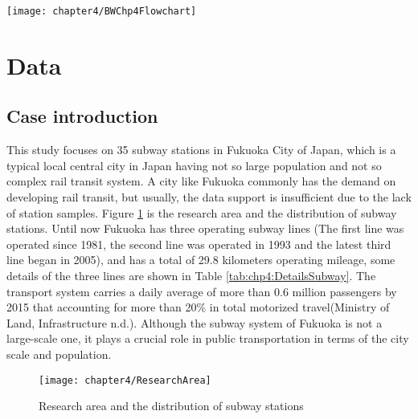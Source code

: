 \begin{sidewaysfigure}[htbp]
	\centering
	\texttt{[image: chapter4/BWChp4Flowchart]}
	\caption{Research flowchart}
	\label{fig:chp4:Chp4Flowchart}
\end{sidewaysfigure}

\section{Data}
\subsection{Case introduction}
%
This study focuses on 35 subway stations in Fukuoka City of Japan, which is a typical local central city in Japan having not so large population and not so complex rail transit system. A city like Fukuoka commonly has the demand on developing rail transit, but usually, the data support is insufficient due to the lack of station samples. Figure \ref{fig:chp4:ResearchArea} is the research area and the distribution of subway stations. Until now Fukuoka has three operating subway lines (The first line was operated since 1981, the second line was operated in 1993 and the latest third line began in 2005), and has a total of 29.8 kilometers operating mileage, some details of the three lines are shown in Table \ref{tab:chp4:DetailsSubway}. The transport system carries a daily average of more than 0.6 million passengers by 2015 that accounting for more than 20\% in total motorized travel(Ministry of Land, Infrastructure n.d.). Although the subway system of Fukuoka is not a large-scale one, it plays a crucial role in public transportation in terms of the city scale and population.

\begin{figure}[htbp]
	\centering
	\texttt{[image: chapter4/ResearchArea]}
	\caption{Research area and the distribution of subway stations}
	\label{fig:chp4:ResearchArea}
	\small
	\renewcommand{\arraystretch}{1.25} %
\end{figure}

